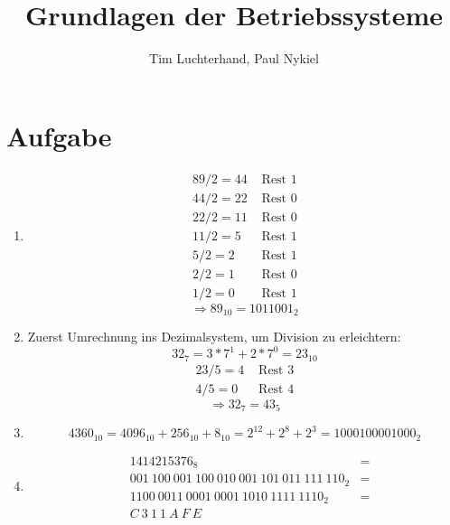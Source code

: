 \documentclass[DIN, pagenumber=false, fontsize=11pt, parskip=half]{scrartcl}
\title{Grundlagen der Betriebssysteme}
\author{Tim Luchterhand, Paul Nykiel}
\begin{document}
    \maketitle
    \section{Aufgabe}
    \begin{enumerate}[label = (\alph*)]
        \item 
            \begin{align*}
                89 / 2  =  44 & \text{ Rest } 1 \\
                44 / 2  =  22 & \text{ Rest } 0 \\
                22 / 2  =  11 & \text{ Rest } 0 \\
                11 / 2  =  5  & \text{ Rest } 1 \\
                5 / 2  =  2 & \text{ Rest } 1 \\
                2 /2  =  1 & \text{ Rest } 0 \\
                1 / 2  =  0 & \text{ Rest } 1 
            \end{align*}
            \begin{equation*}
                \Rightarrow {89}_{10} = {1011001}_2
            \end{equation*}
        \item
            Zuerst Umrechnung ins Dezimalsystem, um Division zu erleichtern:
            \begin{equation*}
                {32}_7 =  3 * 7^1 + 2  * 7^0  = {23}_{10} 
            \end{equation*}
            \begin{align*}
                23 / 5 =  4 & \text{ Rest } 3\\
                4 / 5 =  0 & \text{ Rest } 4
            \end{align*}
            \begin{equation*}
                \Rightarrow  {32}_7 = {43}_5
            \end{equation*}
        \item
            \begin{equation*}
                {4360}_{10} = {4096}_{10} + {256}_{10} + 8_{10} = 2^{12} + 2^{8} + 2^{3} = {1000100001000}_2
            \end{equation*}
        \item
            \begin{eqnarray*}
                & {1414215376}_8 & = \\
                & {001\ 100\ 001\ 100\ 010\ 001\ 101\ 011\ 111\ 110}_2 & = \\
                & {1100\ 0011\ 0001\ 0001\ 1010\ 1111\ 1110}_2 & = \\
                & {C\ 3\ 1\ 1\ A\ F\ E} &
            \end{eqnarray*}
    \end{enumerate}
\end{document}
